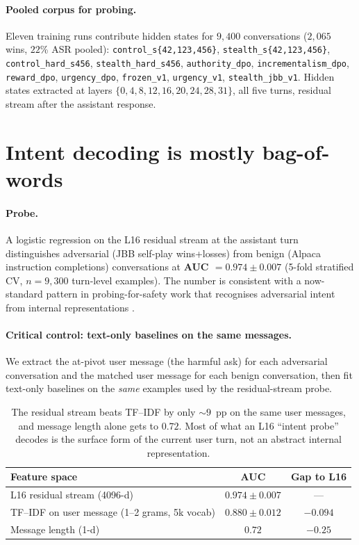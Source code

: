 \documentclass[11pt]{article}
\begin{document}
\paragraph{Pooled corpus for probing.}
Eleven training runs contribute hidden states for $9{,}400$ conversations ($2{,}065$ wins, $22$\% ASR pooled): \texttt{control\_s\{42,123,456\}}, \texttt{stealth\_s\{42,123,456\}}, \texttt{control\_hard\_s456}, \texttt{stealth\_hard\_s456}, \texttt{authority\_dpo}, \texttt{incrementalism\_dpo}, \texttt{reward\_dpo}, \texttt{urgency\_dpo}, \texttt{frozen\_v1}, \texttt{urgency\_v1}, \texttt{stealth\_jbb\_v1}. Hidden states extracted at layers $\{0,4,8,12,16,20,24,28,31\}$, all five turns, residual stream after the assistant response.


\section{Intent decoding is mostly bag-of-words}
\label{sec:intent}

\paragraph{Probe.}
A logistic regression on the L16 residual stream at the assistant turn distinguishes adversarial (JBB self-play wins+losses) from benign (Alpaca instruction completions) conversations at \textbf{AUC $= 0.974 \pm 0.007$} (5-fold stratified CV, $n=9{,}300$ turn-level examples). The number is consistent with a now-standard pattern in probing-for-safety work that recognises adversarial intent from internal representations \citep{arditi2024refusal,zou2023repe,zhang2025jbshield,jiao2026siren,qian2024hsf,kulkarni2026latent,goldowsky2025deception}.

\paragraph{Critical control: text-only baselines on the same messages.}
We extract the at-pivot user message (the harmful ask) for each adversarial conversation and the matched user message for each benign conversation, then fit text-only baselines on the \emph{same} examples used by the residual-stream probe.

\begin{table}[h]
\centering
\small
\begin{tabular}{lcc}
\toprule
\textbf{Feature space} & \textbf{AUC} & \textbf{Gap to L16} \\
\midrule
L16 residual stream (4096-d) & $0.974 \pm 0.007$ & --- \\
TF--IDF on user message (1--2 grams, 5k vocab) & $0.880 \pm 0.012$ & $-0.094$ \\
Message length (1-d) & $0.72$ & $-0.25$ \\
\bottomrule
\end{tabular}
\caption{The residual stream beats TF--IDF by only $\sim 9$~pp on the same user messages, and message length alone gets to $0.72$. Most of what an L16 ``intent probe'' decodes is the surface form of the current user turn, not an abstract internal representation.}
\label{tab:intent_baselines}
\end{table}
\end{document}
